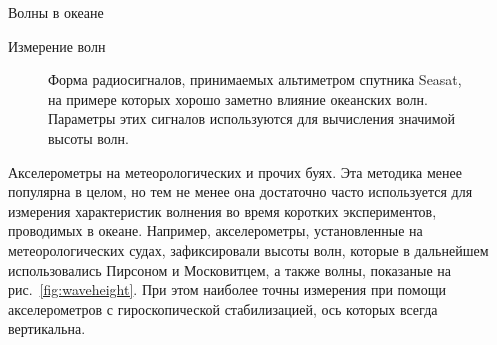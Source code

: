 \begin{chapter}{Волны в океане}
\begin{section}{Измерение волн}
\begin{figure}[t!]
\caption{Форма радиосигналов, принимаемых альтиметром спутника
Seasat, на примере которых хорошо заметно влияние океанских волн.
Параметры этих сигналов используются для вычисления значимой высоты 
волн.~\cite[стр.~264]{Stewart:1985}}
\label{fig:altimeterpulse}
\end{figure}
%

\begin{paragraph}{Акселерометры на метеорологических и прочих буях.} 
Эта методика менее популярна в целом, но тем не менее она достаточно часто
используется для измерения характеристик волнения во время коротких 
экспериментов, проводимых в океане. Например, акселерометры, установленные
на метеорологических судах, зафиксировали высоты волн, которые в дальнейшем
использовались Пирсоном и Московитцем, а также волны, показаные на 
рис.~\ref{fig:waveheight}. При этом наиболее точны измерения при помощи
акселерометров с гироскопической стабилизацией, ось которых всегда 
вертикальна.
%


\end{paragraph}
\end{section}
\end{chapter}
